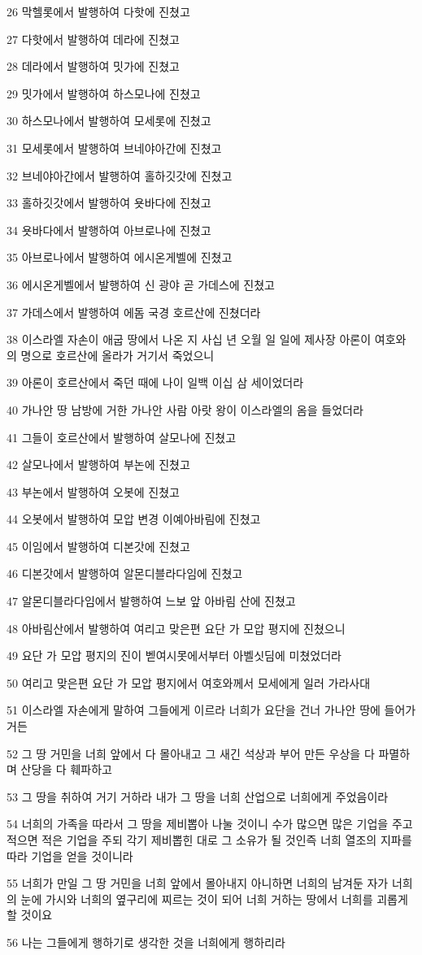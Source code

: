 \par 26 막헬롯에서 발행하여 다핫에 진쳤고
\par 27 다핫에서 발행하여 데라에 진쳤고
\par 28 데라에서 발행하여 밋가에 진쳤고
\par 29 밋가에서 발행하여 하스모나에 진쳤고
\par 30 하스모나에서 발행하여 모세롯에 진쳤고
\par 31 모세롯에서 발행하여 브네야아간에 진쳤고
\par 32 브네야아간에서 발행하여 홀하깃갓에 진쳤고
\par 33 홀하깃갓에서 발행하여 욧바다에 진쳤고
\par 34 욧바다에서 발행하여 아브로나에 진쳤고
\par 35 아브로나에서 발행하여 에시온게벨에 진쳤고
\par 36 에시온게벨에서 발행하여 신 광야 곧 가데스에 진쳤고
\par 37 가데스에서 발행하여 에돔 국경 호르산에 진쳤더라
\par 38 이스라엘 자손이 애굽 땅에서 나온 지 사십 년 오월 일 일에 제사장 아론이 여호와의 명으로 호르산에 올라가 거기서 죽었으니
\par 39 아론이 호르산에서 죽던 때에 나이 일백 이십 삼 세이었더라
\par 40 가나안 땅 남방에 거한 가나안 사람 아랏 왕이 이스라엘의 옴을 들었더라
\par 41 그들이 호르산에서 발행하여 살모나에 진쳤고
\par 42 살모나에서 발행하여 부논에 진쳤고
\par 43 부논에서 발행하여 오봇에 진쳤고
\par 44 오봇에서 발행하여 모압 변경 이예아바림에 진쳤고
\par 45 이임에서 발행하여 디본갓에 진쳤고
\par 46 디본갓에서 발행하여 알몬디블라다임에 진쳤고
\par 47 알몬디블라다임에서 발행하여 느보 앞 아바림 산에 진쳤고
\par 48 아바림산에서 발행하여 여리고 맞은편 요단 가 모압 평지에 진쳤으니
\par 49 요단 가 모압 평지의 진이 벧여시못에서부터 아벨싯딤에 미쳤었더라
\par 50 여리고 맞은편 요단 가 모압 평지에서 여호와께서 모세에게 일러 가라사대
\par 51 이스라엘 자손에게 말하여 그들에게 이르라 너희가 요단을 건너 가나안 땅에 들어가거든
\par 52 그 땅 거민을 너희 앞에서 다 몰아내고 그 새긴 석상과 부어 만든 우상을 다 파멸하며 산당을 다 훼파하고
\par 53 그 땅을 취하여 거기 거하라 내가 그 땅을 너희 산업으로 너희에게 주었음이라
\par 54 너희의 가족을 따라서 그 땅을 제비뽑아 나눌 것이니 수가 많으면 많은 기업을 주고 적으면 적은 기업을 주되 각기 제비뽑힌 대로 그 소유가 될 것인즉 너희 열조의 지파를 따라 기업을 얻을 것이니라
\par 55 너희가 만일 그 땅 거민을 너희 앞에서 몰아내지 아니하면 너희의 남겨둔 자가 너희의 눈에 가시와 너희의 옆구리에 찌르는 것이 되어 너희 거하는 땅에서 너희를 괴롭게 할 것이요
\par 56 나는 그들에게 행하기로 생각한 것을 너희에게 행하리라

